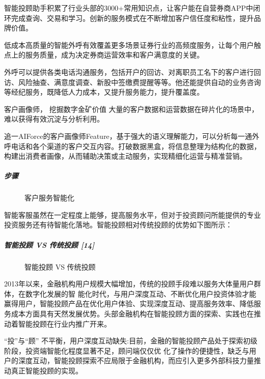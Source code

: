 \documentclass[letterpaper,11pt,english]{sphinxmanual}
\begin{document}
智能投顾助手积累了行业头部的3000+常用知识点，让客户能在自营券商APP中闭环完成查询、交易和学习。创新的服务模式在不断增加客户信任度和粘性，提升品牌价值。

低成本高质量的智能外呼有效覆盖更多场景证券行业的高频度服务，让每个用户触点上的服务质量，成为决定券商运营效率和客户满意度的关键。

外呼可以提供各类电话沟通服务，包括开户的回访、对离职员工名下的客户进行回访、风险抽查、满意度调查、新股中签缴费提醒等等。他还能提供自动的业务咨询等经纪服务，既降低人力成本，又提升服务能力，提升覆盖度。

客户画像师， 挖掘数字金矿价值
大量的客户数据和运营数据在碎片化的场景中，难以获得有效沉淀与分析利用。

追一AIForce的客户画像师Feature，基于强大的语义理解能力，可以分析每一通外呼电话和各个渠道的客户交互内容。打破数据黑盒，将信息整理为结构化的数据，构建出消费者画像，从而辅助决策或主动服务，实现精细化运营与精准营销。


\subparagraph{步骤}
\label{\detokenize{chapter_project/AI_Finance:id13}}
\begin{figure}[H]
\centering
\capstart

\noindent{}
\caption{客户服务智能化}\label{\detokenize{chapter_project/AI_Finance:id36}}\end{figure}

智能客服虽然在一定程度上能够，提高服务水平，但对于投资顾问所能提供的专业投资服务还有待智能化落地。智能投顾相对传统投顾的优势如下图所示：


\subparagraph{智能投顾 VS 传统投顾 {[}14{]}}
\label{\detokenize{chapter_project/AI_Finance:vs-14}}
\begin{figure}[H]
\centering
\capstart

\noindent{}
\caption{智能投顾 VS 传统投顾}\label{\detokenize{chapter_project/AI_Finance:id37}}\end{figure}

2013年以来，金融机构用户规模大幅增加，传统的投顾手段难以服务大体量用户群体，在数字化发展的智
能化时代，与用户深度互动、不断优化用户投资体验才能赢得用户，智能投顾产品在优化用户体验、实现深度互动、提高服务效率、降低服务成本方面具有天然发展优势。头部金融机构在智能投顾方面的探索、实践也在推动着智能投顾在行业内推广开来。

“投”与“顾”
不平衡，用户深度互动缺失:目前，金融的智能投顾产品处于探索初级阶段，投资端智能化程度显著不足，顾问端仅仅优
化了操作的便捷性，缺乏与用户的深度互动，智能投顾探索不应局限于金融机构，而应引入更多外部科技力量推动真正智能投顾的实现。
\end{document}
